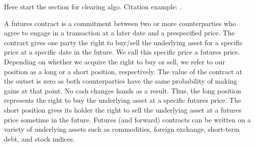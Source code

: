Here start the section for clearing algo. Citation example: \cite{kenyon2002high}.

\begin{definition*}
  A futures contract is a commitment between two or more counterparties who agree to
  engage in a transaction at a later date and a prespecified price. The contract gives
  one party the right to buy/sell the underlying asset for a specific price at a specific
  date in the future. We call this specific price a futures price.
  Depending on whether we acquire the right to buy or sell, we refer to our
  position as a long or a short position, respectively. The value of the contract at
  the outset is zero as both counterparties have the same probability of making
  gains at that point. No cash changes hands as a result.
  Thus, the long position represents the right to buy the underlying asset at a
  specific futures price. The short position gives its holder the right to sell the
  underlying asset at a futures price sometime in the future. Futures (and
  forward) contracts can be written on a variety of underlying assets such as
  commodities, foreign exchange, short-term debt, and stock indices.
\end{definition*}

